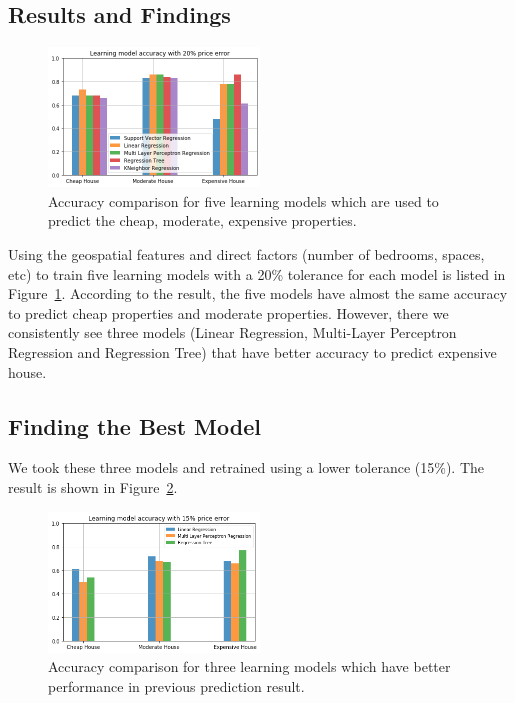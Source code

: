 \documentclass[11pt,a4paper]{article}
\begin{document}
\subsection{Results and Findings}

\begin{figure}[h]
\includegraphics[width=0.5\textwidth]{result-data/tolerance20.png}
\caption{Accuracy comparison for five learning models which are used to predict the cheap, moderate, expensive properties.}
\label{fig:tolerance20}
\centering
\end{figure}
Using the geospatial features and direct factors (number of bedrooms, spaces, etc) to train five learning models with a 20\% tolerance for each model is listed in Figure~\ref{fig:tolerance20}. According to the result, the five models have almost the same accuracy to predict cheap properties and moderate properties. However, there we consistently see three models (Linear Regression, Multi-Layer Perceptron Regression and Regression Tree) that have better accuracy to predict expensive house. 

\subsection{Finding the Best Model}
We took these three models and retrained using a lower tolerance (15\%). The result is shown in Figure~\ref{fig:tolerance15}. 
\begin{figure}[h]
\includegraphics[width=0.5\textwidth]{result-data/tolerance15.png}
\caption{Accuracy comparison for three learning models which have better performance in previous prediction result.}
\label{fig:tolerance15}
\centering
\end{figure}
\end{document}
